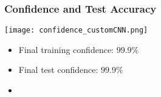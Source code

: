 \documentclass[../presentation.tex]{subfiles} %
\begin{document}
\begin{frame}
    
    \frametitle{Confidence and Test Accuracy}

    \begin{center}
        \texttt{[image: confidence\_customCNN.png]}
    \end{center}

    \small{
    \begin{cbox}
        \begin{itemize}
            \item Final training confidence: $99.9\%$
            \item Final test confidence: $99.9\%$
            \item {}
        \end{itemize}
    \end{cbox}
    }

\end{frame}
\end{document}
